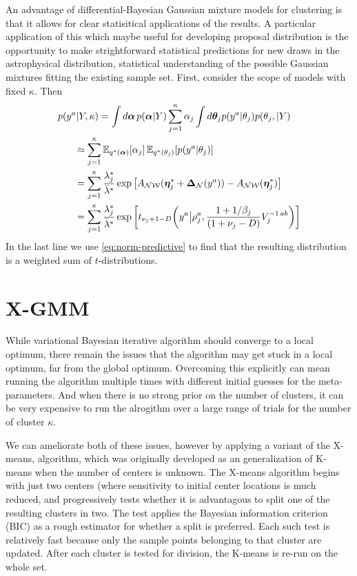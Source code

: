 \documentclass[aps,showpacs,twocolumn,prd,superscriptaddress,nofootinbib]{revtex4}
\newcommand{\nn}{\nonumber}
\newcommand{\E}[1]{{\mathbb E}_{#1}\!}
\begin{document}
An advantage of differential-Bayesian Gaussian mixture models for clustering is that it allows for clear statisitical applications of the results.  A particular application of this which maybe useful for developing proposal distribution is the opportunity to make strightforward statistical predictions for new draws in the astrophysical distribution, statistical understanding of the possible Gaussian mixtures fitting the existing sample set.  First, consider the scope of models with fixed $\kappa$. Then
\begin{align}
  p(y^a|Y,\kappa)&=\int{d\bm\alpha}\, p(\bm\alpha|Y)\sum_{j=1}^\kappa \alpha_j\int{d\bm\theta_j p(y^a|\theta_j)p(\theta_j,|Y)}\nn\\
  &\mkern-45mu\approx \sum_{j=1}^\kappa \E{q^*(\bm\alpha)}\left[\alpha_j\right]\E{q^*(\theta_j)}\left[p(y^a|\theta_j)\right]\nn\\
  &\mkern-45mu= \sum_{j=1}^\kappa \frac{\lambda^*_j}{\bar\lambda^*}\exp\left[A_{\mathcal{NW}}(\bm\eta^*_j+\bm\Delta_{\mathcal{N}}(y^a))-A_{\mathcal{NW}}(\bm\eta^*_j)\right]\nn\\
  &\mkern-45mu=\sum_{j=1}^\kappa \frac{\lambda^*_j}{\bar\lambda^*}\exp\left[ t_{{\nu_j+1-D}}\!\left(y^a\big|\rho_j^a,\frac{1+1/\beta_j}{(1+\nu_j-D)}V_j^{-1\,ab}\right)\right]
\end{align}
In the last line we use \eqref{eq:norm-predictive} to find that the resulting distribution is a weighted sum of $t$-distributions.

\section{X-GMM}

While variational Bayesian iterative algorithm should converge to a local optimum, there remain the issues that the algorithm may get stuck in a local optimum, far from the global optimum.  Overcoming this explicitly can mean running the algorithm multiple times with different initial guesses for the meta-parameters.  And when there is no strong prior on the number of clusters, it can be very expensive to run the alrogithm over a large range of trials for the number of cluster $\kappa$.

We can ameliorate both of these issues, however by applying a variant of the X-means, algorithm, which was originally developed as an generalization of K-means when the number of centers is unknown.  The X-means algorithm begins with just two centers (where sensitivity to initial center locations is much reduced, and progressively tests whether it is advantagous to split one of the resulting clusters in two.  The test applies the Bayesian information criterion (BIC) as a rough estimator for whether a split is preferred. Each such test is relatively fast because only the sample points belonging to that cluster are updated.  After each cluster is tested for division, the K-means is re-run on the whole set.
\end{document}
